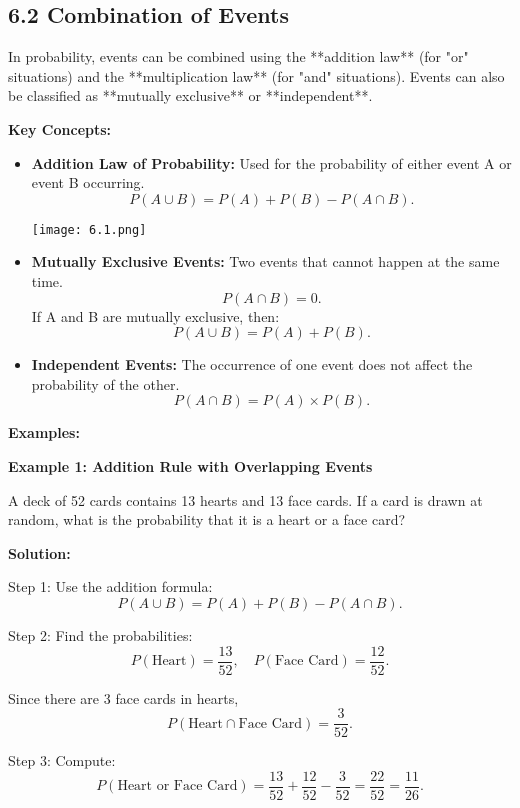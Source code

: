 
\subsection*{6.2 Combination of Events}
In probability, events can be combined using the **addition law** (for "or" situations) and the **multiplication law** (for "and" situations). Events can also be classified as **mutually exclusive** or **independent**.

\textbf{Key Concepts:}
\begin{itemize}
	\item \textbf{Addition Law of Probability:} Used for the probability of either event A or event B occurring.
	\[
	P(A \cup B) = P(A) + P(B) - P(A \cap B).
	\]
	\begin{center}
		\texttt{[image: 6.1.png]}
	\end{center}
	
	
	
	\item \textbf{Mutually Exclusive Events:} Two events that cannot happen at the same time.
	\[
	P(A \cap B) = 0.
	\]
	If A and B are mutually exclusive, then:
	\[
	P(A \cup B) = P(A) + P(B).
	\]
	
	\item \textbf{Independent Events:} The occurrence of one event does not affect the probability of the other.
	\[
	P(A \cap B) = P(A) \times P(B).
	\]
\end{itemize}

\textbf{Examples:}

\begin{flushleft}
	\textbf{Example 1: Addition Rule with Overlapping Events}
	
	A deck of 52 cards contains 13 hearts and 13 face cards. If a card is drawn at random, what is the probability that it is a heart or a face card?
	
	\textbf{Solution:}
	
	Step 1: Use the addition formula:
	\[
	P(A \cup B) = P(A) + P(B) - P(A \cap B).
	\]
	
	Step 2: Find the probabilities:
	\[
	P(\text{Heart}) = \frac{13}{52}, \quad P(\text{Face Card}) = \frac{12}{52}.
	\]
	
	Since there are 3 face cards in hearts, 
	\[
	P(\text{Heart} \cap \text{Face Card}) = \frac{3}{52}.
	\]
	
	Step 3: Compute:
	\[
	P(\text{Heart or Face Card}) = \frac{13}{52} + \frac{12}{52} - \frac{3}{52} = \frac{22}{52} = \frac{11}{26}.
	\]
\end{flushleft}

